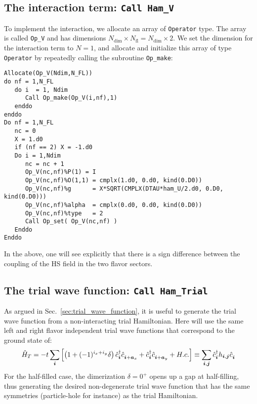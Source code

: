 \subsection{The interaction term: \texttt{Call Ham\_V}}
To implement  the interaction, we allocate an array of \texttt{Operator} type. The array is called  \texttt{Op\_V} and has dimensions $N_{\mathrm{dim}}\times N_{\mathrm{fl}}=N_{\mathrm{dim}} \times 2$. 
We set the dimension for the interaction term to  $N=1$, and  allocate and initialize this array of type  \texttt{Operator} by repeatedly calling the subroutine \texttt{Op\_make}: 

\begin{lstlisting}[style=fortran]
Allocate(Op_V(Ndim,N_FL))
do nf = 1,N_FL
   do i  = 1, Ndim
      Call Op_make(Op_V(i,nf),1)
   enddo
enddo
Do nf = 1,N_FL
   nc = 0
   X = 1.d0
   if (nf == 2) X = -1.d0
   Do i = 1,Ndim
      nc = nc + 1
      Op_V(nc,nf)%P(1) = I
      Op_V(nc,nf)%O(1,1) = cmplx(1.d0, 0.d0, kind(0.D0))
      Op_V(nc,nf)%g      = X*SQRT(CMPLX(DTAU*ham_U/2.d0, 0.D0, kind(0.D0))) 
      Op_V(nc,nf)%alpha  = cmplx(0.d0, 0.d0, kind(0.D0))
      Op_V(nc,nf)%type   = 2
      Call Op_set( Op_V(nc,nf) )
   Enddo
Enddo

\end{lstlisting}
In the above, one will see explicitly that  there is a sign   difference between  the coupling of the HS field  in  the  two flavor sectors. 

\subsection{The trial wave function: \texttt{Call Ham\_Trial}}
As  argued in Sec.~\ref{sec:trial_wave_function}, it is useful to generate the trial wave function from a non-interacting trial Hamiltonian.   Here will  use the same left and right   flavor independent trial  wave functions  that correspond to the ground state of: 
\begin{equation}
   \hat{H}_T    = - t \sum_{\ve{i}} \left[  \left( 1 + (-1)^{i_x + i_y}  \delta \right)  \hat{c}^{\dagger}_{\ve{i}}   \hat{c}^{\phantom\dagger}_{\ve{i} +\ve{a}_x}  +  
   							 \hat{c}^{\dagger}_{\ve{i}}   \hat{c}^{\phantom\dagger}_{\ve{i} +\ve{a}_y}    + H.c.  \right]   \equiv   \sum_{\ve{i},\ve{j}}  \hat{c}^{\dagger}_{\ve{i}}   h_{\ve{i},\ve{j}}  \hat{c}^{\phantom\dagger}_{\ve{i}} 
\end{equation}
For the half-filled case, the  dimerization $\delta  = 0^{+} $  opens up a gap at  half-filling,   thus generating the desired  non-degenerate  trial wave function  that has the same symmetries (particle-hole  for instance) as  the   trial  Hamiltonian.

